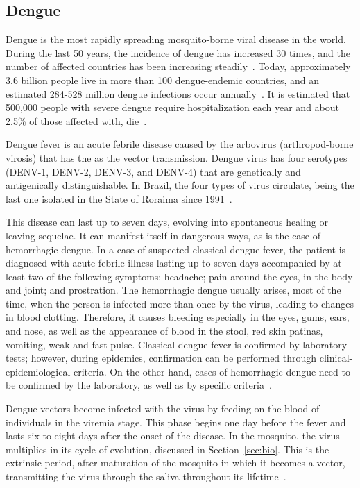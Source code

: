 \subsection{Dengue}

Dengue is the most rapidly spreading mosquito-borne viral disease in the world.
During the last 50 years, the incidence of dengue has increased 30 times, and the number of affected countries has been increasing steadily~\cite{rigau1998dengue}.
Today, approximately 3.6 billion people live in more than 100 dengue-endemic countries, and an estimated 284-528 million dengue infections occur annually~\cite{guzman2010dengue}.
It is estimated that 500,000 people with severe dengue require hospitalization each year and about 2.5\% of those affected with, die~\cite{web:who2014dengue}.

Dengue fever is an acute febrile disease caused by the arbovirus (arthropod-borne virosis) that has the \Aedes as the vector transmission.
Dengue virus has four serotypes (DENV-1, DENV-2, DENV-3, and DENV-4) that are genetically and antigenically distinguishable.
In Brazil, the four types of virus circulate, being the last one isolated in the State of Roraima since 1991~\cite{teixeira2009dengue}.

This disease can last up to seven days, evolving into spontaneous healing or leaving sequelae.
It can manifest itself in dangerous ways, as is the case of hemorrhagic dengue.
In a case of suspected classical dengue fever, the patient is diagnosed with acute febrile illness lasting up to seven days accompanied by at least two of the following symptoms: headache; pain around the eyes, in the body and joint; and prostration.
%
The hemorrhagic dengue usually arises, most of the time, when the person is infected more than once by the virus, leading to changes in blood clotting.
Therefore, it causes bleeding especially in the eyes, gums, ears, and nose, as well as the appearance of blood in the stool, red skin patinas, vomiting, weak and fast pulse.
Classical dengue fever is confirmed by laboratory tests; however, during epidemics, confirmation can be performed through clinical-epidemiological criteria.
On the other hand, cases of hemorrhagic dengue need to be confirmed by the laboratory, as well as by specific criteria~\cite{brasil2002dengue}.

Dengue vectors become infected with the virus by feeding on the blood of individuals in the viremia stage.
This phase begins one day before the fever and lasts six to eight days after the onset of the disease.
In the mosquito, the virus multiplies in its cycle of evolution, discussed in Section~\ref{sec:bio}. This is the extrinsic period, after maturation of the mosquito in which it becomes a vector, transmitting the virus through the saliva throughout its lifetime~\cite{watts1987effect}.

